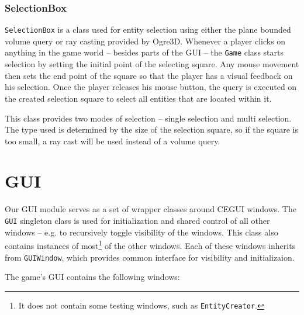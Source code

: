 \subsubsection{SelectionBox}

\texttt{SelectionBox} is a class used for entity selection using either the plane bounded volume query or ray casting provided by Ogre3D.
Whenever a player
clicks on anything in the game world -- besides parts of the GUI -- the \texttt{Game} class starts selection by setting the initial
point of the selecting square. Any mouse movement then sets the end point of the square so that the player has a visual feedback on his
selection. Once the player releases his mouse button, the query is executed on the created selection square to select all entities that
are located within it.

This class provides two modes of selection -- single selection and multi selection. The type used is determined by the size of the
selection square, so if the square is too small, a ray cast will be used instead of a volume query.

\section{GUI}

Our GUI module serves as a set of wrapper classes around CEGUI windows. The \texttt{GUI} singleton class is used for initialization and
shared control of all other windows -- e.g. to recursively toggle visibility of the windows. This class also contains instances of
most\footnote{It does not contain some testing windows, such as \texttt{EntityCreator}.}
of the other windows. Each of these windows inherits from \texttt{GUIWindow}, which provides common interface for visibility and
initializaion.

The game's GUI contains the following windows:

